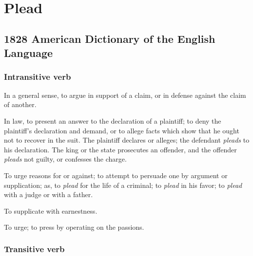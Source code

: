 \section{Plead}
	\label{PLEAD}
	

\subsection{1828 American Dictionary of the English Language} %
	\label{PLEAD-1828}
	
	\subsubsection{Intransitive verb}

		\begin{compactitem}
			\item In a general sense, to argue in support of a claim, or in defense against the claim of another.
			\item[1] In law, to present an answer to the declaration of a plaintiff; to deny the plaintiff's declaration and demand, or to allege facts which show that he ought not to recover in the suit. The plaintiff declares or alleges; the defendant \textit{pleads} to his declaration. The king or the state prosecutes an offender, and the offender \textit{pleads} not guilty, or confesses the charge.
			\item[2] To urge reasons for or against; to attempt to persuade one by argument or supplication; as, to \textit{plead} for the life of a criminal; to \textit{plead} in his favor; to \textit{plead} with a judge or with a father.
			\item[3] To supplicate with earnestness.
			\item[4] To urge; to press by operating on the passions.
		\end{compactitem}
		
	\subsubsection{Transitive verb}
	
